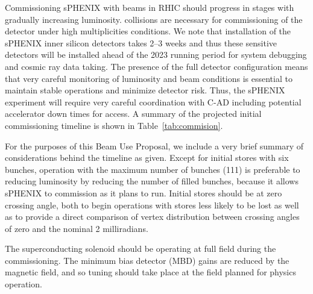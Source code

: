Commissioning sPHENIX with beams in RHIC should progress in stages
with gradually increasing luminosity.  \auau collisions are necessary
for commissioning of the detector under high multiplicities conditions.
We note that
installation of the sPHENIX inner silicon detectors takes 2--3 weeks
and thus these sensitive detectors will be installed ahead of the 2023
running period for system debugging and cosmic ray data taking.  The
presence of the full detector configuration means that very careful
monitoring of luminosity and beam conditions is essential to maintain
stable operations and minimize detector risk.  Thus, the sPHENIX
experiment will require very careful coordination with C-AD including
potential accelerator down times for access.  A summary of the
projected initial commissioning timeline is shown in
Table~\ref{tab:commision}.


For the purposes of this Beam Use Proposal, we include a very brief
summary of considerations behind the timeline as given.  Except for initial stores with six
bunches, operation with the maximum number of bunches (111) is
preferable to reducing luminosity by reducing the number of filled
bunches, because it allows sPHENIX to commission as it plans to run.
Initial stores should be at zero crossing angle, both to begin operations
with stores less likely to be lost as well as to provide a direct
comparison of vertex distribution between crossing angles of zero and
the nominal 2 milliradians.

The superconducting solenoid should be operating at full field during
the commissioning.  The minimum bias detector (MBD) gains are reduced
by the magnetic field, and so tuning should take place at the field
planned for physics operation.

